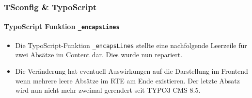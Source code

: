\begin{frame}[fragile]
	\frametitle{TSconfig \& TypoScript}
	\framesubtitle{TypoScript Funktion \texttt{\_encapsLines}}

	\begin{itemize}
		\item Die TypoScript-Funktion \texttt{\_encapsLines} stellte eine nachfolgende Leerzeile für zwei Absätze im Content dar. Dies wurde nun repariert.

		\item Die Veränderung hat eventuell Auswirkungen auf die Darstellung im Frontend wenn mehrere leere Absätze im RTE am Ende existieren. Der letzte Absatz wird nun nicht mehr zweimal gerendert seit TYPO3 CMS 8.5.

	\end{itemize}

\end{frame}

